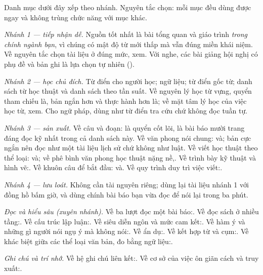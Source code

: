 \documentclass[../../english.tex]{subfiles}
\begin{document}
Danh mục dưới đây xếp theo nhánh. Nguyên tắc chọn: mỗi mục đều dùng được ngay và không trùng chức năng với mục khác.

\emph{Nhánh 1 --- tiếp nhận dễ.} Nguồn tốt nhất là bài tổng quan và giáo trình \emph{trong chính ngành bạn}, vì chúng có mật độ từ mới thấp mà vẫn đúng miền khái niệm. Về nguyên tắc chọn tài liệu ở đúng mức, xem\cite{daybamford1998}. Với nghe, các bài giảng hội nghị có phụ đề và bản ghi là lựa chọn tự nhiên ().

\emph{Nhánh 2 --- học chủ đích.} Từ điển cho người học\cite{oald,ldoce}; ngữ liệu\cite{coca}; từ điển gốc từ\cite{etymonline}; danh sách từ học thuật\cite{coxhead2000} và danh sách theo tần suất\cite{ngsl}. Về nguyên lý học từ vựng, quyển tham chiếu là\cite{nation2013}, bản ngắn hơn và thực hành hơn là\cite{webbnation2017}; về mặt tâm lý học của việc học từ, xem\cite{schmitt2000}. Cho ngữ pháp, dùng như từ điển tra cứu chứ không đọc tuần tự\cite{swan2016,murphy2019}.

\emph{Nhánh 3 --- sản xuất.} Về câu và đoạn:\cite{williams2016} là quyển cốt lõi,\cite{gopenswan1990} là bài báo mười trang đáng đọc kỹ nhất trong cả danh sách này. Về văn phong nói chung:\cite{zinsser2006} và\cite{pinker2014}; bản cực ngắn\cite{strunkwhite1999} nên đọc như một tài liệu lịch sử chứ không như luật. Về viết học thuật theo thể loại:\cite{swalesfeak2012} và\cite{booth2016}; về phê bình văn phong học thuật nặng nề,\cite{sword2012}. Về trình bày kỹ thuật và hình vẽ:\cite{alley2018}. Về khuôn câu để bắt đầu:\cite{graff2021} và\cite{manchesterphrasebank}. Về quy trình duy trì việc viết:\cite{silvia2007}.

\emph{Nhánh 4 --- lưu loát.} Không cần tài nguyên riêng; dùng lại tài liệu nhánh 1 với đồng hồ bấm giờ, và dùng chính bài báo bạn vừa đọc để nói lại trong ba phút.

\emph{Đọc và hiểu sâu (xuyên nhánh).} Về ba lượt đọc một bài báo:\cite{keshav2007}. Về đọc sách ở nhiều tầng:\cite{adler1972}. Về cấu trúc lập luận:\cite{toulmin1958}. Về siêu diễn ngôn và mức cam kết:\cite{hyland2005,hyland1998}. Về hàm ý và những gì người nói ngụ ý mà không nói:\cite{grice1975}. Về ẩn dụ:\cite{lakoff1980}. Về kết hợp từ và cụm:\cite{sinclair1991,lewis1993,wray2002,hoey2005}. Về khác biệt giữa các thể loại văn bản, đo bằng ngữ liệu:\cite{biber1999}.

\emph{Ghi chú và trí nhớ.} Về hệ ghi chú liên kết:\cite{ahrens2017}. Về cơ sở của việc ôn giãn cách và truy xuất:\cite{cepeda2006,roediger2006}.
\end{document}

